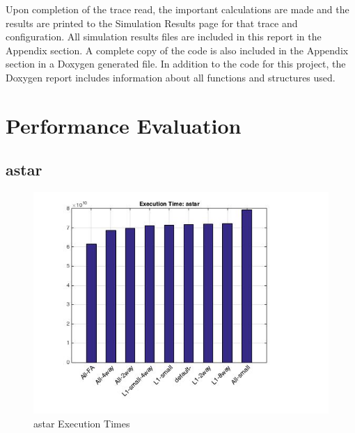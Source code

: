 \documentclass[11pt,titlepage]{article}
\begin{document}
    Upon completion of the trace read, the important calculations are made and the results are printed to the Simulation Results page for that trace and configuration. All simulation results files are included in this report in the Appendix section. A complete copy of the code is also included in the Appendix section in a Doxygen generated file. In addition to the code for this project, the Doxygen report includes information about all functions and structures used.

\section{Performance Evaluation}

    \subsection{astar}
        \begin{figure}[H]
            \centering
            \includegraphics[scale=0.75]{etastar}
            \caption{astar Execution Times}
            \label{fig:etastar}
        \end{figure}
\end{document}
